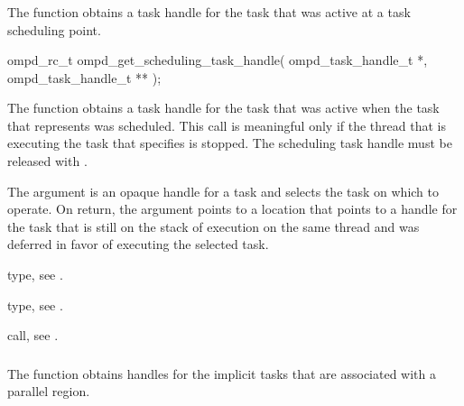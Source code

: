 \subsubsection{}
\label{subsubsubsec:ompd_get_scheduling_task_handle}
\summary
The  function obtains a task handle 
for the task that was active at a task scheduling point.

\format
\begin{cspecific}
\begin{ompSyntax}
ompd_rc_t ompd_get_scheduling_task_handle(
  ompd_task_handle_t *,
  ompd_task_handle_t **
);
\end{ompSyntax}
\end{cspecific}

\descr
The  function obtains a task handle 
for the task that was active when the task that  represents
was scheduled. This call is meaningful only if the thread that is executing 
the task that  specifies is stopped. The scheduling task 
handle must be released with .

\argdesc
The  argument is an opaque handle for a task and selects 
the task on which to operate. On return, the  
argument points to a location that points to a handle for the task that is
still on the stack of execution on the same thread and was deferred in favor 
of executing the selected task.

\begin{crossrefs}
\item {} type, see .

\item {} type, see .

\item {} call, see 
.
\end{crossrefs}



\subsubsection{}
\label{subsubsubsec:ompd_get_task_in_parallel}
\summary
The   function obtains handles for
the implicit tasks that are associated with a parallel region.

